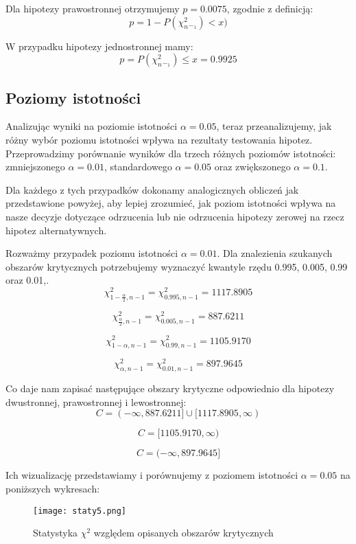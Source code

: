 \documentclass[12pt,letterpaper]{article}
\theoremstyle{definition}
\begin{document}
{{Dla hipotezy prawostronnej otrzymujemy $p = 0.0075$, zgodnie z definicją:
\[
p = 1 - P(\chi^2_n_-_1) < x)
\]

W przypadku hipotezy jednostronnej mamy:
\[
p = P(\chi^2_n_-_1) \leq x = 0.9925
\]

\subsection{Poziomy istotności}
Analizując wyniki na poziomie istotności $\alpha = 0.05$, teraz przeanalizujemy, jak różny wybór poziomu istotności wpływa na rezultaty testowania hipotez. Przeprowadzimy porównanie wyników dla trzech różnych poziomów istotności: zmniejszonego $\alpha = 0.01$, standardowego $\alpha = 0.05$ oraz zwiększonego $\alpha = 0.1$.

Dla każdego z tych przypadków dokonamy analogicznych obliczeń jak przedstawione powyżej, aby lepiej zrozumieć, jak poziom istotności wpływa na nasze decyzje dotyczące odrzucenia lub nie odrzucenia hipotezy zerowej na rzecz hipotez alternatywnych.

Rozważmy przypadek poziomu istotności \(\alpha = 0.01\). Dla znalezienia szukanych obszarów krytycznych potrzebujemy wyznaczyć kwantyle rzędu 0.995, 0.005, 0.99 oraz 0.01,. 
\[
\chi^2_{1 - \frac{\alpha}{2}, n - 1} = \chi^2_{0.995, n - 1} = 1117.8905
\]

\[
\chi^2_{\frac{\alpha}{2}, n - 1} = \chi^2_{0.005, n - 1} = 887.6211
\]

\[
\chi^2_{1 - \alpha, n - 1} = \chi^2_{0.99, n - 1} = 1105.9170
\]

\[
\chi^2_{\alpha, n - 1} = \chi^2_{0.01, n - 1} = 897.9645
\]

Co daje nam zapisać następujące obszary krytyczne odpowiednio dla hipotezy dwustronnej, prawostronnej i lewostronnej:
\[
C = (-\infty, 887.6211]  \cup [1117.8905, \infty)
\]

\[
C = [1105.9170, \infty)
\]

\[
C = (-\infty, 897.9645]
\]

Ich wizualizację przedstawiamy i porównujemy z poziomem istotności $\alpha = 0.05$ na poniższych wykresach:

\begin{figure}[H]
			\centering

				\centering
				\texttt{[image: staty5.png]}
				\caption{Statystyka $\chi^2$ względem opisanych obszarów krytycznych}
				\label{fig:zdjecie1}
			\hfill
		\end{figure}

}}
\end{document}
